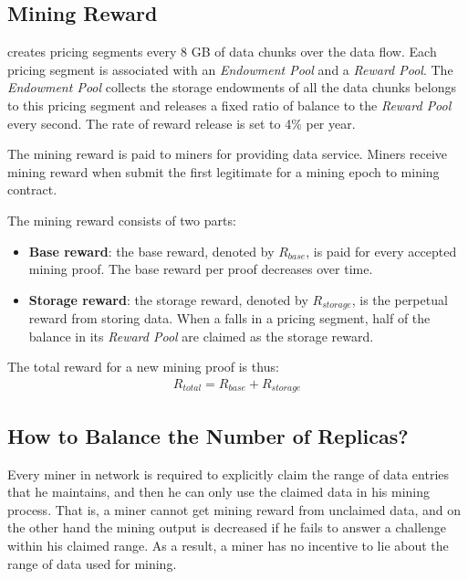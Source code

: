 

\subsection{Mining Reward}
\label{subsec:mining reward}

{\project} creates pricing segments every 8 GB of data chunks over the data flow. 
%
Each pricing segment is associated with an \emph{Endowment Pool} and a \emph{Reward Pool}. 
%
The \emph{Endowment Pool} collects the storage endowments of all the data chunks belongs to this pricing segment and releases a fixed ratio of balance to the \emph{Reward Pool} every second. 
%
The rate of reward release is set to 4\% per year. 


The mining reward is paid to miners for providing data service.
Miners receive mining reward when submit the first legitimate {\sproof} for a mining epoch to {\project} mining contract.

The mining reward consists of two parts:
\begin{itemize}
	\item {\bf Base reward}: the base reward, denoted by $R_{base}$, is paid for every accepted mining proof. The base reward per proof decreases over time.

	\item {\bf Storage reward}:  the storage reward, denoted by $R_{storage}$, is the perpetual reward from storing data. 
	When a {\sproof} falls in a pricing segment, half of the balance in its \emph{Reward Pool} are claimed as the storage reward. 

\end{itemize}

The total reward for a new mining proof is thus:
\begin{align}
	R_{total} = R_{base} + R_{storage}
\end{align}


\subsection{How to Balance the Number of Replicas?}

Every miner in \project network is required to explicitly claim the range of data entries that he maintains, 
and then he can only use the claimed data in his mining process.
That is, a miner cannot get mining reward from unclaimed data, and on the other hand the mining output is decreased if he fails to answer a challenge within his claimed range.
As a result, a miner has no incentive to lie about the range of data used for mining.


